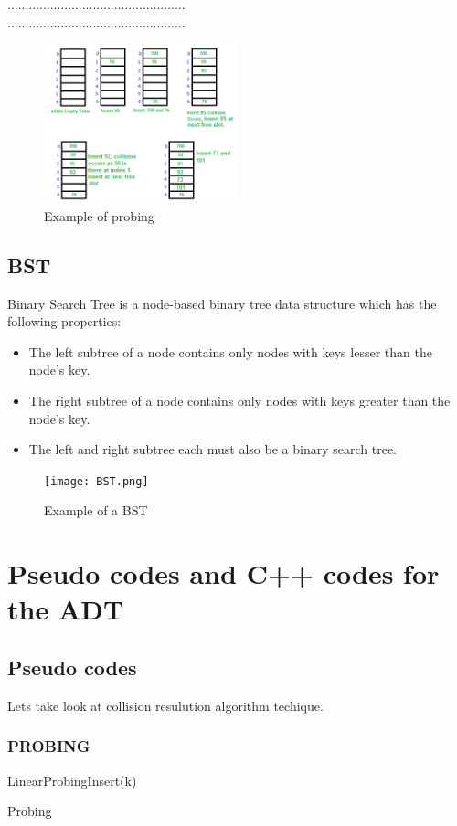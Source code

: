 \documentclass{report}
\begin{document}
..................................................\\
..................................................\\
\begin{figure}[h]
\caption{Example of probing}

\vspace{0.5cm}
\centering
\includegraphics[width=0.5\textwidth]{probing.png}
\end{figure}
\newpage
\section{\large BST}
Binary Search Tree is a node-based binary tree data structure which has the following properties:
\begin{itemize}
    \item The left subtree of a node contains only nodes with keys lesser than the node’s key.
    \item The right subtree of a node contains only nodes with keys greater than the node’s key.
    \item The left and right subtree each must also be a binary search tree.
\end{itemize}
\begin{figure}[h]
\caption{Example of a BST}

\vspace{0.5cm}
\centering
\texttt{[image: BST.png]}
\end{figure}
\chapter{\Large Pseudo codes and C++ codes for the ADT}
\section{\large Pseudo codes}
Lets take look at collision resulution algorithm techique.\\
\subsection{\textbf{\large PROBING}}
\begin{algorithm}
LinearProbingInsert(k)\;
\caption{Probing}\label{alg:one}
\end{algorithm}
\newpage
\end{document}
